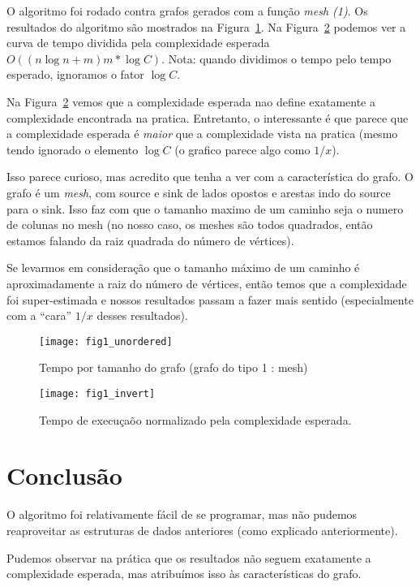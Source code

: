 \documentclass{article}
\begin{document}
O algoritmo foi rodado contra grafos gerados com a função \emph{mesh (1)}. Os resultados do
algoritmo são mostrados na Figura~\ref{fig:grafico}. Na Figura~\ref{fig:grafico_inv} podemos ver a
curva de tempo dividida pela complexidade esperada $ O((n\log n + m)m * \log C) $. Nota: quando
dividimos o tempo pelo tempo esperado, ignoramos o fator $\log C$.

Na Figura~\ref{fig:grafico_inv} vemos que a complexidade esperada nao define exatamente a
complexidade encontrada na pratica. Entretanto, o interessante é que parece que a complexidade
esperada é \emph{maior} que a complexidade vista na pratica (mesmo tendo ignorado o elemento $\log
C$ (o grafico parece algo como $1/x$).

Isso parece curioso, mas acredito que tenha a ver com a característica do grafo. O grafo é um
\emph{mesh}, com source e sink de lados opostos e arestas indo do source para o sink. Isso faz com
que o tamanho maximo de um caminho seja o numero de colunas no mesh (no nosso caso, os meshes são
todos quadrados, então estamos falando da raiz quadrada do número de vértices).

Se levarmos em consideração que o tamanho máximo de um caminho é aproximadamente a raiz do número de
vértices, então temos que a complexidade foi super-estimada e nossos resultados passam a fazer mais
sentido (especialmente com a ``cara'' $1/x$ desses resultados).

\begin{figure}
 \center
 \texttt{[image: fig1\_unordered]}
 \caption{Tempo por tamanho do grafo (grafo do tipo 1 : mesh)}
 \label{fig:grafico}
\end{figure}

\begin{figure}
 \center
 \texttt{[image: fig1\_invert]}
 \caption{Tempo de execuçaõo normalizado pela complexidade esperada.}
 \label{fig:grafico_inv}
\end{figure}


\section{Conclusão}

O algoritmo foi relativamente fácil de se programar, mas não pudemos reaproveitar as estruturas de
dados anteriores (como explicado anteriormente).

Pudemos observar na prática que os resultados não seguem exatamente a complexidade esperada, mas
atribuímos isso às características do grafo.
\end{document}
